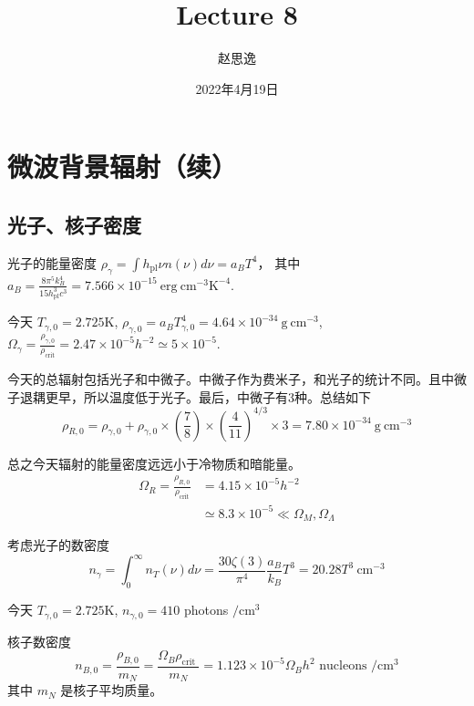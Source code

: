 \documentclass[12pt]{ctexart}
\title{Lecture 8}
\author{赵思逸}
\date{2022年4月19日}
\begin{document}
\maketitle

\section*{微波背景辐射（续）}

\subsection*{光子、核子密度}

光子的能量密度 $\rho_\gamma = \int h_{\mathrm{pl}} \nu n(\nu) d\nu = a_B T^4$， 其中 $a_B=\frac{8\pi^5 k_B^4}{15 h_{\mathrm{pl}}^3 c^3 } = 7.566\times 10^{-15} \mathrm{~erg~cm^{-3}K^{-4}}$.

今天 $T_{\gamma,0} = 2.725 \mathrm{K}$, $\rho_{\gamma,0}=a_B T_{\gamma,0}^4 = 4.64\times 10^{-34} \mathrm{~g~cm^{-3}}$,
$\Omega_\gamma = \frac{\rho_{\gamma,0}}{\rho_\text{crit}} = 2.47\times 10^{-5} h^{-2} \simeq 5\times 10^{-5}$.

今天的总辐射包括光子和中微子。中微子作为费米子，和光子的统计不同。且中微子退耦更早，所以温度低于光子。最后，中微子有3种。总结如下
\begin{equation}
    \rho_{R, 0}=\rho_{\gamma, 0}+\rho_{\gamma, 0} \times\left(\frac{7}{8}\right) \times\left(\frac{4}{11}\right)^{4 / 3} \times 3 =7.80 \times 10^{-34} \mathrm{~g~cm^{-3}}
\end{equation}

总之今天辐射的能量密度远远小于冷物质和暗能量。
\begin{equation}
    \begin{aligned}
        \Omega_{R}=\frac{\rho_{R, 0}}{\rho_\text{crit}} &=4.15 \times 10^{-5} h^{-2} \\
        & \simeq 8.3 \times 10^{-5} \ll \Omega_M, \Omega_\Lambda
    \end{aligned}
\end{equation}

考虑光子的数密度
\begin{equation}
    n_{\gamma}=\int_{0}^{\infty} n_{T}(\nu) d \nu=\frac{30 \zeta(3)}{\pi^{4}} \frac{a_{B}}{k_{B}} T^{3}=20.28 T^{3} \mathrm{~cm}^{-3}
\end{equation}

今天 $T_{\gamma,0} = 2.725 \mathrm{K}$, $n_{\gamma, 0}=410$ photons $/ \mathrm{cm}^{3}$

核子数密度
\begin{equation}
    n_{B, 0}=\frac{\rho_{B, 0}}{m_{N}}=\frac{\Omega_{B} \rho_{\text {crit }}}{m_{N}}=1.123 \times 10^{-5} \Omega_{B} h^{2} \text { nucleons } / \mathrm{cm}^{3}
\end{equation}
其中 $m_{N}$ 是核子平均质量。
\end{document}
